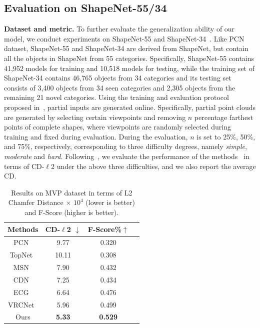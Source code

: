 \documentclass[letterpaper]{article} %
\begin{document}
{\subsection{Evaluation on ShapeNet-55/34}

{\bf{Dataset and metric.}}
To further evaluate the generalization ability of our model, we conduct experiments on ShapeNet-55 and ShapeNet-34~\cite{yu2021pointr}. Like PCN dataset, ShapeNet-55 and ShapeNet-34 are derived from ShapeNet, but contain all the objects in ShapeNet from 55 categories.
Specifically, ShapeNet-55 contains 41,952 models for training and 10,518 models for testing,
while the training set of ShapeNet-34 contains 46,765 objects from 34 categories and its testing set consists of 3,400 objects from 34 seen categories and 2,305 objects from the remaining 21 novel categories. Using the training and evaluation protocol proposed in~\cite{yu2021pointr}, partial inputs are generated online.
Specifically, partial point clouds are generated by selecting certain viewpoints and removing $n$ percentage farthest points of complete shapes, where viewpoints are randomly selected during training and  fixed during evaluation.
During the evaluation, $n$ is set to 25\%, 50\%, and 75\%, respectively, corresponding to three difficulty degrees, namely {\textit {simple}}, {\textit {moderate}} and {\textit {hard}}.
Following~\cite{yu2021pointr}, we evaluate the performance of the methods~\cite{yang2018foldingnet, yuan2018pcn, tchapmi2019topnet, huang2020pf, xie2020grnet, yu2021pointr, zhou2022seedformer} in terms of CD-$\ell$2 under the above three difficulties, and we also report the average CD.

\begin{table}
\begin{center}
\small
\begin{tabular}{c|ccc}
\toprule
Methods  &CD-$\ell$2 $\downarrow$ &F-Score\%$\uparrow$ \\
\midrule
 PCN~\cite{yuan2018pcn} & 9.77 &0.320\\
 TopNet~\cite{tchapmi2019topnet} &10.11&0.308\\
 MSN~\cite{liu2020morphing}	&7.90&0.432\\
 CDN~\cite{wang2020cascaded}	&7.25&0.434\\
 ECG~\cite{pan2020ecg}	&6.64&0.476\\
VRCNet~\cite{pan2021variational} &5.96&0.499\\
\midrule
Ours&\bf{5.33} &\bf{0.529}\\
\bottomrule
\end{tabular}
\end{center}
\caption{Results on MVP dataset in terms of  L2 Chamfer Distance $\times$ $10^4$ (lower is better) and F-Score (higher is better). } \label{tab:mvp}
\end{table}



}
\end{document}
